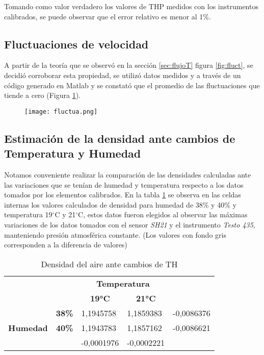 Tomando como valor verdadero los valores de THP medidos con los instrumentos calibrados, se puede observar que el error relativo es menor al 1\%.

\subsection{Fluctuaciones de velocidad}
A partir de la teoría que se observó en la sección \ref{sec:flujoT} figura \ref{fig:fluct}, se decidió corroborar esta propiedad, se utilizó datos medidos y a través de un código generado en Matlab y se constató que el promedio de las fluctuaciones que tiende a cero (Figura \ref{fig:fluct2}).
\begin{figure}[H]
	\centering
	\texttt{[image: fluctua.png]}
	\label{fig:fluct2}
\end{figure}


\subsection{Estimación de la densidad ante cambios de Temperatura y Humedad}
Notamos conveniente realizar la comparación de las densidades calculadas ante las variaciones que se tenían de humedad y temperatura respecto a los datos tomados por los elementos calibrados. En la tabla \ref{densTH} se observa en las celdas internas los valores calculados de densidad para humedad de 38$\%$ y 40$\%$ y temperatura 19$^{\circ}$C y 21$^{\circ}$C, estos datos fueron elegidos al observar las máximas variaciones de los datos tomados con el sensor \textit{SH21} y el instrumento \textit{Testo 435}, manteniendo presión atmosférica constante.
(Los valores con fondo gris corresponden a la diferencia de valores)

\begin{table}[h!]
	\centering
	\begin{tabular}{lllll}
		&  & \multicolumn{2}{c}{\textbf{Temperatura}} &  \\
		&  & \multicolumn{1}{c}{\textbf{19°C}} & \multicolumn{1}{c}{\textbf{21°C}} & \multicolumn{1}{c}{\textbf{}} \\
		\multicolumn{1}{c}{} & \multicolumn{1}{r}{\textbf{38\%}} & 1,1945758 & 1,1859383 & \cellcolor[HTML]{F2F2F2}-0,0086376 \\
		\multicolumn{1}{c}{\multirow{-2}{*}{\textbf{Humedad}}} & \multicolumn{1}{r}{\textbf{40\%}} & 1,1943783 & 1,1857162 & \cellcolor[HTML]{F2F2F2}-0,0086621 \\
		& \multicolumn{1}{c}{\textbf{}} & \cellcolor[HTML]{F2F2F2}-0,0001976 & \cellcolor[HTML]{F2F2F2}-0,0002221 & 
	\end{tabular}
\caption{Densidad del aire ante cambios de TH}
\label{densTH}
\end{table}


